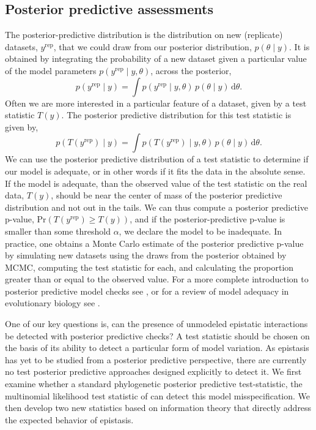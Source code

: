 \documentclass[11pt]{article}
\begin{document}
\subsection*{Posterior predictive assessments\label{sec:pps}}

The posterior-predictive distribution is the distribution on new (replicate) datasets, $y^{\text{rep}}$, that we could draw from our posterior distribution, $p(\theta \mid y)$.
It is obtained by integrating the probability of a new dataset given a particular value of the model parameters $p(y^{\text{rep}} \mid y, \theta)$, across the posterior,
\[
  p(y^{\text{rep}} \mid y) =
  \int p(y^{\text{rep}} \mid y, \theta)\,
  p(\theta \mid y)\,
  \text{d}\theta.
\]
Often we are more interested in a particular feature of a dataset, given by a test statistic $T(y)$.
The posterior predictive distribution for this test statistic is given by,
\[
  p(T(y^{\text{rep}}) \mid y) =
  \int p(T(y^{\text{rep}}) \mid y, \theta)\,
  p(\theta \mid y)\,
  \text{d}\theta.
\]
We can use the posterior predictive distribution of a test statistic to determine if our model is adequate, or in other words if it fits the data in the absolute sense.
If the model is adequate, than the observed value of the test statistic on the real data, $T(y)$, should be near the center of mass of the posterior predictive distribution and not out in the tails.
We can thus compute a posterior predictive p-value, $\text{Pr}(T(y^{\text{rep}}) \geq T(y))$, and if the posterior-predictive p-value is smaller than some threshold $\alpha$, we declare the model to be inadequate.
In practice, one obtains a Monte Carlo estimate of the posterior predictive p-value by simulating new datasets using the draws from the posterior obtained by MCMC, computing the test statistic for each, and calculating the proportion greater than or equal to the observed value.
For a more complete introduction to posterior predictive model checks see \citet{gelman2004bda}, or for a review of model adequacy in evolutionary biology see \citet{brown2018evaluating}.

One of our key questions is, can the presence of unmodeled epistatic interactions be detected with posterior predictive checks?
A test statistic should be chosen on the basis of its ability to detect a particular form of model variation.
As epistasis has yet to be studied from a posterior predictive perspective, there are currently no test posterior predictive approaches designed explicitly to detect it.
We first examine whether a standard phylogenetic posterior predictive test-statistic, the multinomial likelihood test statistic of \cite{goldman1993statistical} can detect this model misspecification.
We then develop two new statistics based on information theory that directly address the expected behavior of epistasis.
\end{document}
